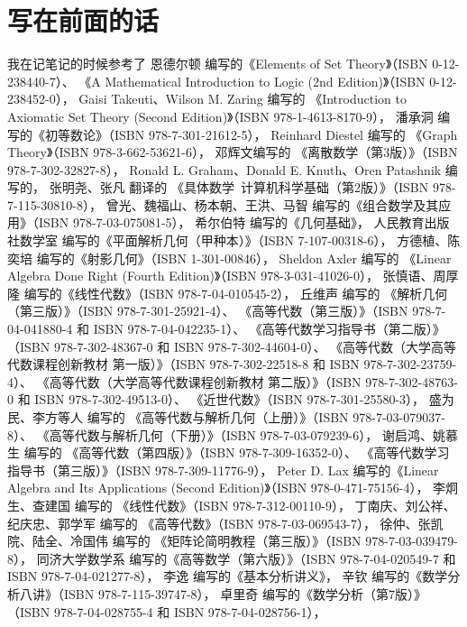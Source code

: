 \chapter*{写在前面的话}
我在记笔记的时候参考了
恩德尔顿 编写的《Elements of Set Theory》（ISBN 0-12-238440-7）、
《A Mathematical Introduction to Logic (2nd Edition)》（ISBN 0-12-238452-0），
Gaisi Takeuti、Wilson M. Zaring 编写的
《Introduction to Axiomatic Set Theory (Second Edition)》（ISBN 978-1-4613-8170-9），
潘承洞 编写的《初等数论》（ISBN 978-7-301-21612-5），
Reinhard Diestel 编写的
《Graph Theory》（ISBN 978-3-662-53621-6），
邓辉文编写的
《离散数学（第3版）》（ISBN 978-7-302-32827-8），
Ronald L. Graham、Donald E. Knuth、Oren Patashnik 编写的，
张明尧、张凡 翻译的
《具体数学\ 计算机科学基础（第2版）》（ISBN 978-7-115-30810-8），
曾光、魏福山、杨本朝、王洪、马智 编写的《组合数学及其应用》（ISBN 978-7-03-075081-5），
希尔伯特 编写的《几何基础》，
人民教育出版社数学室 编写的《平面解析几何（甲种本）》（ISBN 7-107-00318-6），
方德植、陈奕培 编写的《射影几何》（ISBN 1-301-00846），
Sheldon Axler 编写的
《Linear Algebra Done Right (Fourth Edition)》（ISBN 978-3-031-41026-0），
张慎语、周厚隆 编写的《线性代数》（ISBN 978-7-04-010545-2），
丘维声 编写的
《解析几何（第三版）》（ISBN 978-7-301-25921-4）、
《高等代数（第三版）》（ISBN 978-7-04-041880-4 和 ISBN 978-7-04-042235-1）、
《高等代数学习指导书（第二版）》（ISBN 978-7-302-48367-0 和 ISBN 978-7-302-44604-0）、
《高等代数（大学高等代数课程创新教材 第一版）》（ISBN 978-7-302-22518-8 和 ISBN 978-7-302-23759-4）、
《高等代数（大学高等代数课程创新教材 第二版）》（ISBN 978-7-302-48763-0 和 ISBN 978-7-302-49513-0）、
《近世代数》（ISBN 978-7-301-25580-3），
盛为民、李方等人 编写的
《高等代数与解析几何（上册）》（ISBN 978-7-03-079037-8）、
《高等代数与解析几何（下册）》（ISBN 978-7-03-079239-6），
谢启鸿、姚慕生 编写的
《高等代数（第四版）》（ISBN 978-7-309-16352-0）、
《高等代数学习指导书（第三版）》（ISBN 978-7-309-11776-9），
Peter D. Lax 编写的《Linear Algebra and Its Applications (Second Edition)》（ISBN 978-0-471-75156-4），
李炯生、查建国 编写的
《线性代数》（ISBN 978-7-312-00110-9），
丁南庆、刘公祥、纪庆忠、郭学军 编写的
《高等代数》（ISBN 978-7-03-069543-7），
徐仲、张凯院、陆全、冷国伟 编写的
《矩阵论简明教程（第三版）》（ISBN 978-7-03-039479-8），
同济大学数学系 编写的《高等数学（第六版）》（ISBN 978-7-04-020549-7 和 ISBN 978-7-04-021277-8），
李逸 编写的《基本分析讲义》，
辛钦 编写的《数学分析八讲》（ISBN 978-7-115-39747-8），
卓里奇 编写的《数学分析（第7版）》（ISBN 978-7-04-028755-4 和 ISBN 978-7-04-028756-1），
